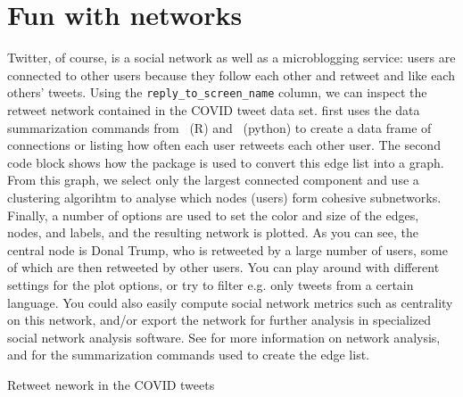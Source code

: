 

\section{Fun with networks}

Twitter, of course, is a social network as well as a microblogging service:
users are connected to other users because they follow each other and retweet and like each others' tweets.
Using the \verb+reply_to_screen_name+ column, we can inspect the retweet network contained in the COVID tweet data set.
 first uses the data summarization commands from \tidyverse\ (R) and \pandas\ (python) to
create a data frame of connections or  listing how often each user retweets each other user.
The second code block shows how the  package is used to convert this edge list into a graph.
From this graph, we select only the largest connected component and use a clustering algorihtm to analyse which
nodes (users) form cohesive subnetworks.
Finally, a number of options are used to set the color and size of the edges, nodes, and labels,
and the resulting network is plotted.
As you can see, the central node is Donal Trump, who is retweeted by a large number of users,
some of which are then retweeted by other users.
You can play around with different settings for the plot options,
or try to filter e.g. only tweets from a certain language. 
You could also easily compute social network metrics such as centrality on this network,
and/or export the network for further analysis in specialized social network analysis software.
See  for more information on network analysis,
and  for the summarization commands used to create the edge list.

\begin{ccsexample}
\caption{Retweet nework in the COVID tweets}\label{ex:fungraph}
\end{ccsexample}

